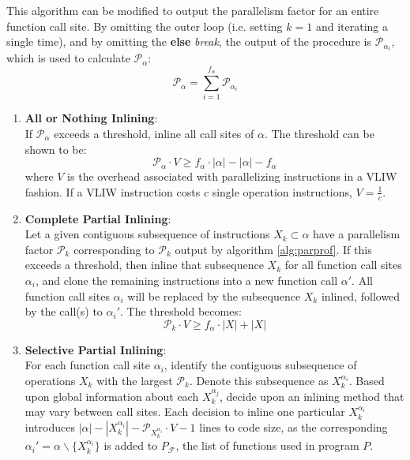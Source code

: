 \documentclass[12pt,twoside]{article}
\begin{document}
	This algorithm can be modified to output the parallelism factor for an entire function call site. By omitting the outer loop (i.e. setting $k = 1$ and iterating a single time), and by omitting the \textbf{else} \emph{break}, the output of the procedure is $\mathcal{P}_{\alpha_i}$, which is used to calculate $\mathcal{P}_{\alpha}$:
	\begin{equation}
		\mathcal{P}_\alpha = \sum_{i=1}^{f_{\alpha}} \mathcal{P}_{\alpha_i}
	\end{equation}
	
	\begin{enumerate}
	\item \textbf{All or Nothing Inlining}:\\
		If $\mathcal{P}_{\alpha}$ exceeds a threshold, inline all call sites of $\alpha$. The threshold can be shown to be:
		\begin{equation}
			\mathcal{P}_{\alpha} \cdot V \geq f_{\alpha} \cdot |\alpha| - |\alpha| - f_{\alpha}
		\end{equation}
		where $V$ is the overhead associated with parallelizing instructions in a VLIW fashion. If a VLIW instruction costs $c$ single operation instructions, $V = \frac{1}{c}$.
	\item \textbf{Complete Partial Inlining}:\\
		Let a given contiguous subsequence of instructions $X_k \subset \alpha$ have a parallelism factor $\mathcal{P}_{k}$ corresponding to $\mathcal{P}_k$ output by algorithm \ref{alg:parprof}. If this exceeds a threshold, then inline that subsequence $X_k$ for all function call sites $\alpha_i$, and clone the remaining instructions into a new function call $\alpha'$. All function call sites $\alpha_i$ will be replaced by the subsequence $X_k$ inlined, followed by the call(s) to $\alpha_i'$.
		The threshold becomes:
		\begin{equation}
			\mathcal{P}_k \cdot V \geq f_{\alpha} \cdot |X| + |X|
		\end{equation}
	\item \textbf{Selective Partial Inlining}:\\
		For each function call site $\alpha_i$, identify the contiguous subsequence of operations $X_k$ with the largest $\mathcal{P}_k$. Denote this subsequence as $X_k^{\alpha_i}$. Based upon global information about each $X_k^{\alpha_j}$, decide upon an inlining method that may vary between call sites. Each decision to inline one particular $X_k^{\alpha_i}$ introduces $|\alpha| - |X_k^{\alpha_i}| - \mathcal{P}_{X_k^{\alpha_i}} \cdot V - 1$ lines to code size, as the corresponding $\alpha_i' = \alpha\backslash \{X_k^{\alpha_i}\}$ is added to $P_{\mathcal{F}}$, the list of functions used in program $P$. 
\end{enumerate}
\end{document}
